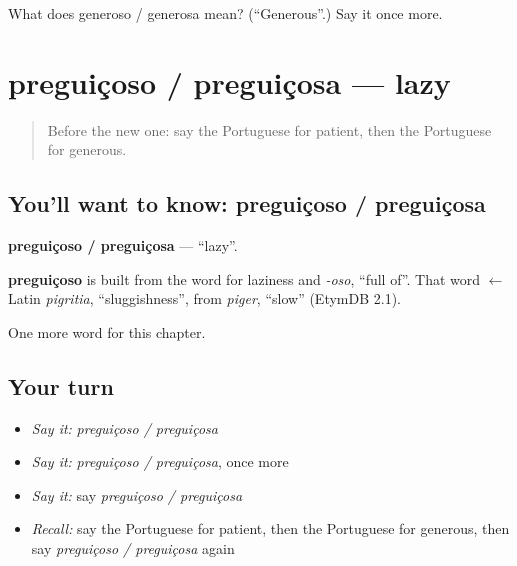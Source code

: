\begin{tcolorbox}[breakable,colback=teal!4,colframe=teal!35!black,title={Before you move on}]
What does generoso / generosa mean? (\textquotedblleft{}Generous\textquotedblright{}.) Say it once more.
\end{tcolorbox}
\section[preguiçoso / preguiçosa]{preguiçoso / preguiçosa — lazy}

\label{lesson:PT-C155-preguicoso-preguicosa}



\begin{quote}
Before the new one: say the Portuguese for patient, then the Portuguese for generous.
\end{quote}

\subsection*{You'll want to know: preguiçoso / preguiçosa}
\textbf{preguiçoso / preguiçosa} — \textquotedblleft{}lazy\textquotedblright{}.

\begin{cousinweb}
\textbf{preguiçoso} is built from the word for laziness and \emph{-oso}, \textquotedblleft{}full of\textquotedblright{}. That word $\leftarrow$ Latin \emph{pigritia}, \textquotedblleft{}sluggishness\textquotedblright{}, from \emph{piger}, \textquotedblleft{}slow\textquotedblright{} (EtymDB 2.1).
\end{cousinweb}

\begin{grammarlens}[title={What you've built}]
One more word for this chapter.
\end{grammarlens}

\subsection*{Your turn}
\begin{itemize}
\raggedright
  \item \emph{Say it:} \emph{preguiçoso / preguiçosa}
  \item \emph{Say it:} \emph{preguiçoso / preguiçosa}, once more
  \item \emph{Say it:} say \emph{preguiçoso / preguiçosa}
  \item \emph{Recall:} say the Portuguese for patient, then the Portuguese for generous, then say \emph{preguiçoso / preguiçosa} again
\end{itemize}

